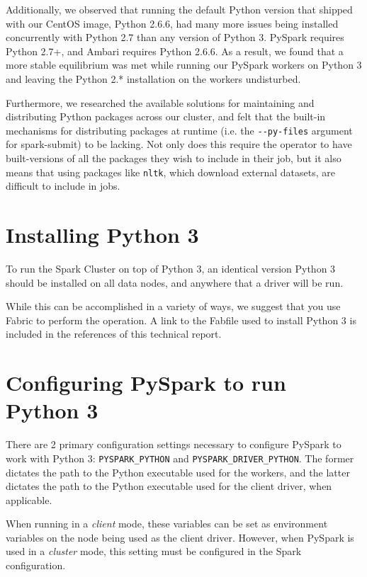 \documentclass[9pt,twocolumn,twoside]{idsi}
\begin{document}
Additionally, we observed that running the default Python version that shipped with our CentOS image, Python 2.6.6, had many more issues being installed concurrently with Python 2.7 than any version of Python 3. PySpark requires Python 2.7+, and Ambari requires Python 2.6.6. As a result, we found that a more stable equilibrium was met while running our PySpark workers on Python 3 and leaving the Python 2.* installation on the workers undisturbed.

Furthermore, we researched the available solutions for maintaining and distributing Python packages across our cluster, and felt that the built-in mechanisms for distributing packages at runtime (i.e. the \texttt{-\--py-files} argument for spark-submit) to be lacking. Not only does this require the operator to have built-versions of all the packages they wish to include in their job, but it also means that using packages like \texttt{nltk}, which download external datasets, are difficult to include in jobs.

\section{Installing Python 3}
To run the Spark Cluster on top of Python 3, an identical version Python 3 should be installed on all data nodes, and anywhere that a driver will be run.

While this can be accomplished in a variety of ways, we suggest that you use Fabric to perform the operation. A link to the Fabfile used to install Python 3 is included in the references of this technical report.

\section{Configuring PySpark to run Python 3}

There are 2 primary configuration settings necessary to configure PySpark to work with Python 3: \texttt{PYSPARK\_PYTHON} and \texttt{PYSPARK\_DRIVER\_PYTHON}. The former dictates the path to the Python executable used for the workers, and the latter dictates the path to the Python executable used for the client driver, when applicable.

When running in a \emph{client} mode, these variables can be set as environment variables on the node being used as the client driver. However, when PySpark is used in a \emph{cluster} mode, this setting must be configured in the Spark configuration.
\end{document}
